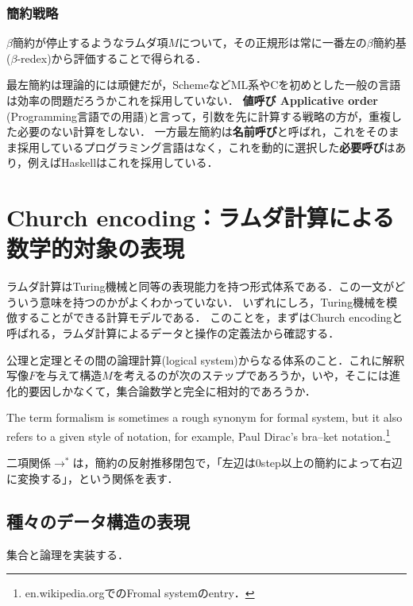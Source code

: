 \documentclass[uplatex, dvipdfmx]{jsreport}
\begin{document}
\subsubsection*{簡約戦略}

\begin{theorem}[最左簡約]
    $\beta$簡約が停止するようなラムダ項$M$について，その正規形は常に一番左の$\beta$簡約基($\beta$-redex)から評価することで得られる．
\end{theorem}
\begin{remark}[名前呼びと値呼びと必要呼び]
    最左簡約は理論的には頑健だが，SchemeなどML系やCを初めとした一般の言語は効率の問題だろうかこれを採用していない．
    \textbf{値呼び Applicative order} (Programming言語での用語)と言って，引数を先に計算する戦略の方が，重複した必要のない計算をしない．
    一方最左簡約は\textbf{名前呼び}と呼ばれ，これをそのまま採用しているプログラミング言語はなく，これを動的に選択した\textbf{必要呼び}はあり，例えばHaskellはこれを採用している．
\end{remark}

\section{Church encoding：ラムダ計算による数学的対象の表現}
ラムダ計算はTuring機械と同等の表現能力を持つ形式体系である．この一文がどういう意味を持つのかがよくわかっていない．
いずれにしろ，Turing機械を模倣することができる計算モデルである．
このことを，まずはChurch encodingと呼ばれる，ラムダ計算によるデータと操作の定義法から確認する．

\begin{definition}
    公理と定理とその間の論理計算(logical system)からなる体系のこと．これに解釈写像$F$を与えて構造$M$を考えるのが次のステップであろうか，いや，そこには進化的要因しかなくて，集合論数学と完全に相対的であろうか．
\end{definition}
\begin{remark}
    The term formalism is sometimes a rough synonym for formal system, but it also refers to a given style of notation, for example, Paul Dirac's bra–ket notation.\footnote{en.wikipedia.orgでのFromal systemのentry．}
\end{remark}

\begin{notation}
    二項関係$\to^*$は，簡約の反射推移閉包で，「左辺は0step以上の簡約によって右辺に変換する」，という関係を表す．
\end{notation}

\subsection{種々のデータ構造の表現}
集合と論理を実装する．
\end{document}
